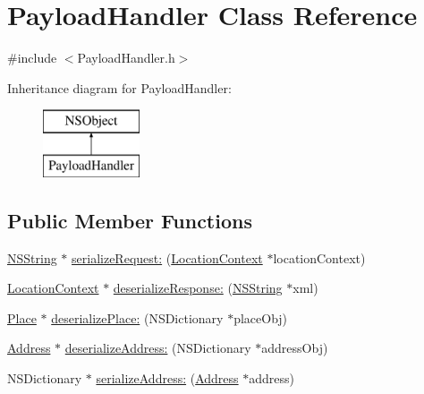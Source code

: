 \hypertarget{interface_payload_handler}{
\section{\-Payload\-Handler \-Class \-Reference}
\label{interface_payload_handler}
}


{\ttfamily \#include $<$\-Payload\-Handler.\-h$>$}

\-Inheritance diagram for \-Payload\-Handler\-:\begin{figure}[H]
\begin{center}
\leavevmode
\includegraphics[height=2.000000cm]{interface_payload_handler}
\end{center}
\end{figure}
\subsection*{\-Public \-Member \-Functions}
\begin{DoxyCompactItemize}
\item 
\hyperlink{class_n_s_string}{\-N\-S\-String} $\ast$ \hyperlink{interface_payload_handler_aae7823911df4810cfcad6d492399d10b}{serialize\-Request\-:} (\hyperlink{interface_location_context}{\-Location\-Context} $\ast$location\-Context)
\item 
\hyperlink{interface_location_context}{\-Location\-Context} $\ast$ \hyperlink{interface_payload_handler_afe934ee604d56ecb57fbfc8daf701c16}{deserialize\-Response\-:} (\hyperlink{class_n_s_string}{\-N\-S\-String} $\ast$xml)
\item 
\hyperlink{interface_place}{\-Place} $\ast$ \hyperlink{interface_payload_handler_a70ad2aafbaf50649c9b481c88a31fe45}{deserialize\-Place\-:} (\-N\-S\-Dictionary $\ast$place\-Obj)
\item 
\hyperlink{interface_address}{\-Address} $\ast$ \hyperlink{interface_payload_handler_a0285bc55790dd82c21d5ca1c0fc6b9ec}{deserialize\-Address\-:} (\-N\-S\-Dictionary $\ast$address\-Obj)
\item 
\-N\-S\-Dictionary $\ast$ \hyperlink{interface_payload_handler_a77b5df6ee5e93902de11add7feb9256e}{serialize\-Address\-:} (\hyperlink{interface_address}{\-Address} $\ast$address)
\end{DoxyCompactItemize}
